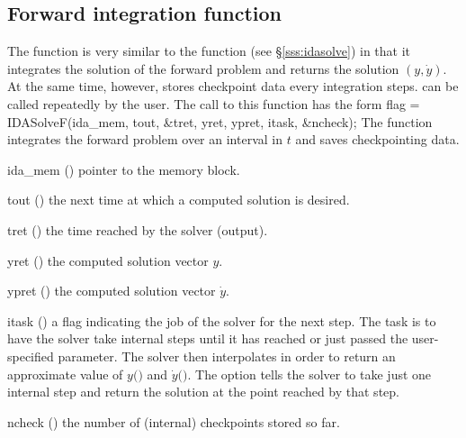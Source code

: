 \subsection{Forward integration function}
\label{sss:idasolvef}

The function  is very similar to the {\idas} function 
(see \S\ref{sss:idasolve}) in that it integrates the solution of the forward
problem and returns the solution $(y,\dot{y})$. At the same time, however, 
 stores checkpoint data every  integration steps.  
can be called repeatedly by the user.
The call to this function has the form
{
  flag = IDASolveF(ida\_mem, tout, \&tret, yret, ypret, itask, \&ncheck);
}
{
  The function  integrates the forward problem over an interval in $t$
  and saves checkpointing data.
}
{
  \begin{args}
  \item[ida\_mem] ()
    pointer to the {\idas} memory block.
  \item[tout] ()
    the next time at which a computed solution is desired.
  \item[tret] ()
    the time reached by the solver (output).
  \item[yret] ()
    the computed solution vector $y$.
  \item[ypret] ()
    the computed solution vector $\dot{y}$.
  \item[itask] ()
    a flag indicating the job of the solver for the next step. 
    The  task is to have the solver take internal steps until   
    it has reached or just passed the user-specified 
    parameter. The solver then interpolates in order to   
    return an approximate value of $y($$)$ and $\dot{y}($$)$. 
    The  option tells the solver to take just one internal step  
    and return the solution at the point reached by that step. 
  \item[ncheck] ()
    the number of (internal) checkpoints stored so far.
  \end{args}
}
